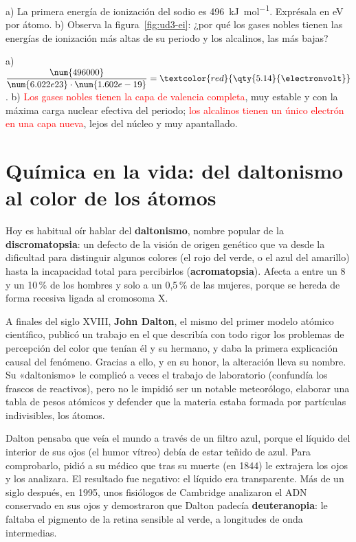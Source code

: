 \begin{exercise}
    a) La primera energía de ionización del sodio es \qty{496}{\kilo\joule\per\mol}. Exprésala en eV por átomo. b) Observa la
    figura~\ref{fig:ud3-ei}: ¿por qué los gases nobles tienen las energías de ionización más altas de su periodo y los alcalinos,
    las más bajas?
    \begin{solu}
        a) \(\dfrac{\num{496000}}{\num{6.022e23} \cdot \num{1.602e-19}} = \textcolor{red}{\qty{5.14}{\electronvolt}}\).
        b) \textcolor{red}{Los gases nobles tienen la capa de valencia completa}, muy estable y con la máxima carga nuclear efectiva
        del periodo; \textcolor{red}{los alcalinos tienen un único electrón en una capa nueva}, lejos del núcleo y muy apantallado.
    \end{solu}
\end{exercise}

\section{Química en la vida: del daltonismo al color de los átomos}\label{sec:ud3-daltonismo}

Hoy es habitual oír hablar del \textbf{daltonismo}, nombre popular de la \textbf{discromatopsia}: un defecto de la visión de
origen genético que va desde la dificultad para distinguir algunos colores (el rojo del verde, o el azul del amarillo) hasta la
incapacidad total para percibirlos (\textbf{acromatopsia}). Afecta a entre un 8 y un 10\,\% de los hombres y solo a un 0,5\,\% de
las mujeres, porque se hereda de forma recesiva ligada al cromosoma X.

A finales del siglo XVIII, \textbf{John Dalton}, el mismo del primer modelo atómico científico, publicó un trabajo en el que
describía con todo rigor los problemas de percepción del color que tenían él y su hermano, y daba la primera explicación causal
del fenómeno. Gracias a ello, y en su honor, la alteración lleva su nombre. Su «daltonismo» le complicó a veces el trabajo de
laboratorio (confundía los frascos de reactivos), pero no le impidió ser un notable meteorólogo, elaborar una tabla de pesos
atómicos y defender que la materia estaba formada por partículas indivisibles, los átomos.

Dalton pensaba que veía el mundo a través de un filtro azul, porque el líquido del interior de sus ojos (el humor vítreo) debía
de estar teñido de azul. Para comprobarlo, pidió a su médico que tras su muerte (en 1844) le extrajera los ojos y los analizara.
El resultado fue negativo: el líquido era transparente. Más de un siglo después, en 1995, unos fisiólogos de Cambridge analizaron
el ADN conservado en sus ojos y demostraron que Dalton padecía \textbf{deuteranopia}: le faltaba el pigmento de la retina
sensible al verde, a longitudes de onda intermedias.

